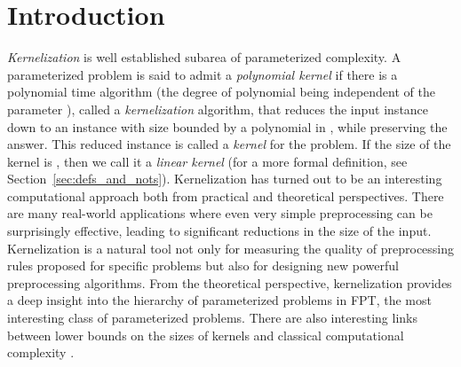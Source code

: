 \documentclass[11pt]{article}
\begin{document}




\maketitle



\section{Introduction}
{\em Kernelization} is well established subarea of parameterized complexity. 
 A parameterized problem is said to admit a {\em polynomial kernel} if there is a polynomial time algorithm (the degree of polynomial being independent of the parameter ), called a {\em kernelization} algorithm, that reduces the input instance down to an instance with size bounded by a polynomial  in , while preserving the answer. This reduced instance is called a {\em  kernel} for the problem. If the size of the kernel is , then we call it a {\em linear kernel} (for a more formal definition, see Section~\ref{sec:defs_and_nots}). Kernelization has turned out to  be an interesting computational approach both from practical and theoretical perspectives. There are many real-world applications where even very simple preprocessing can be surprisingly effective, leading to significant reductions  in the size of the input. Kernelization is a natural tool not only for  measuring the quality of preprocessing rules proposed for  specific problems but also for designing new powerful preprocessing algorithms. From the theoretical perspective, kernelization provides a deep insight into the hierarchy of parameterized problems in  {\sf FPT}, the most interesting class of parameterized problems.  There are also interesting links  
  between lower bounds on the sizes of kernels and classical computational complexity  \cite{BDFH08,Dell:2010sh,DruckerA12}. 
 
 
 
\end{document}
